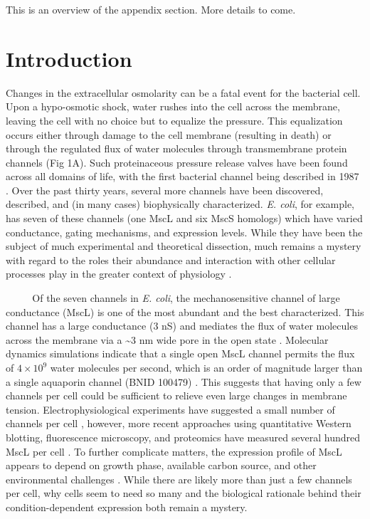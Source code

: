 \documentclass[12pt]{caltech_thesis}
\begin{document}
This is an overview of the appendix section. More details to come.

\hypertarget{introduction-4}{%
\section{Introduction}\label{introduction-4}}

Changes in the extracellular osmolarity can be a fatal event for the
bacterial cell. Upon a hypo-osmotic shock, water rushes into the cell
across the membrane, leaving the cell with no choice but to equalize the
pressure. This equalization occurs either through damage to the cell
membrane (resulting in death) or through the regulated flux of water
molecules through transmembrane protein channels (Fig 1A). Such
proteinaceous pressure release valves have been found across all domains
of life, with the first bacterial channel being described in 1987
\autocite{martinac1987}. Over the past thirty years, several more
channels have been discovered, described, and (in many cases)
biophysically characterized. \emph{E. coli}, for example, has seven of
these channels (one MscL and six MscS homologs) which have varied
conductance, gating mechanisms, and expression levels. While they have
been the subject of much experimental and theoretical dissection, much
remains a mystery with regard to the roles their abundance and
interaction with other cellular processes play in the greater context of
physiology
\autocite{bavi2016,bialecka-fornal2012,bialecka-fornal2015,edwards2012,naismith2012,ursell2008,vandenberg2016}.

~~ ~ ~Of the seven channels in \emph{E. coli}, the mechanosensitive
channel of large conductance (MscL) is one of the most abundant and the
best characterized. This channel has a large conductance (3 nS) and
mediates the flux of water molecules across the membrane via a
\textasciitilde3 nm wide pore in the open state
\autocite{cruickshank1997,haswell2011}. Molecular dynamics simulations
indicate that a single open MscL channel permits the flux of
\(4 \times 10^9\) water molecules per second, which is an order of
magnitude larger than a single aquaporin channel (BNID 100479)
\autocite{louhivuori2010,milo2010}. This suggests that having only a few
channels per cell could be sufficient to relieve even large changes in
membrane tension. Electrophysiological experiments have suggested a
small number of channels per cell \autocite{booth2005,hase1997},
however, more recent approaches using quantitative Western blotting,
fluorescence microscopy, and proteomics have measured several hundred
MscL per cell \autocite{bialecka-fornal2012,schmidt2016,soufi2015}. To
further complicate matters, the expression profile of MscL appears to
depend on growth phase, available carbon source, and other environmental
challenges
\autocites[\textcite{schmidt2016}]{bialecka-fornal2012}{soufi2015,stokes2003}.
While there are likely more than just a few channels per cell, why cells
seem to need so many and the biological rationale behind their
condition-dependent expression both remain a mystery.
\end{document}
